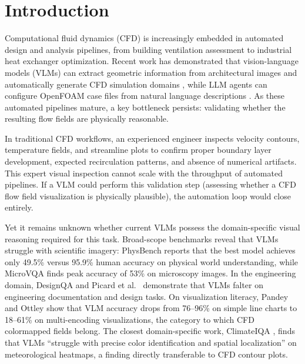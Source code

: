 \documentclass[preprint,12pt]{elsarticle}
\begin{document}

\section{Introduction}

Computational fluid dynamics (CFD) is increasingly embedded in automated design and
analysis pipelines, from building ventilation assessment
\cite{calzolari.liu2021DeepLearning,ding.lam2019DatadrivenModel} to industrial heat exchanger optimization.
Recent work has demonstrated that vision-language models (VLMs) can extract geometric
information from architectural images and automatically generate CFD simulation
domains \cite{joo2026AutomatedIndoor}, while LLM agents can configure OpenFOAM case files
from natural language descriptions \cite{pandey.etal2025OpenFOAMGPTRetrievalaugmented,dong.etal2025FinetuningLarge}.
As these automated pipelines mature, a key bottleneck persists: validating
whether the resulting flow fields are physically reasonable.

In traditional CFD workflows, an experienced engineer inspects velocity contours,
temperature fields, and streamline plots to confirm proper boundary layer
development, expected recirculation patterns, and absence of numerical artifacts.
This expert visual inspection cannot scale with the throughput of automated
pipelines. If a VLM could perform this validation step (assessing whether a CFD
flow field visualization is physically plausible), the automation loop would close
entirely.

Yet it remains unknown whether current VLMs possess the domain-specific visual
reasoning required for this task. Broad-scope benchmarks reveal that VLMs struggle
with scientific imagery: PhysBench \cite{chow.etal2025PhysBenchBenchmarking} reports that the best
model achieves only 49.5\% versus 95.9\% human accuracy on physical world
understanding, while MicroVQA \cite{burgess.etal2025MicroVQAMultimodal} finds peak accuracy of
53\% on microscopy images. In the engineering domain, DesignQA
\cite{doris.etal2024DesignQAMultimodal} and Picard et al.\ \cite{picard.etal2025ConceptManufacturing} demonstrate
that VLMs falter on engineering documentation and design tasks. On visualization
literacy, Pandey and Ottley \cite{pandey.ottley2025BenchmarkingVisionLanguage} show that VLM
accuracy drops from 76--96\% on simple line charts to 18--61\% on multi-encoding
visualizations, the category to which CFD colormapped fields belong. The closest
domain-specific work, ClimateIQA \cite{chen.etal2024ClimateIQAMultimodal}, finds that VLMs
``struggle with precise color identification and spatial localization'' on
meteorological heatmaps, a finding directly transferable to CFD contour plots.
\end{document}
